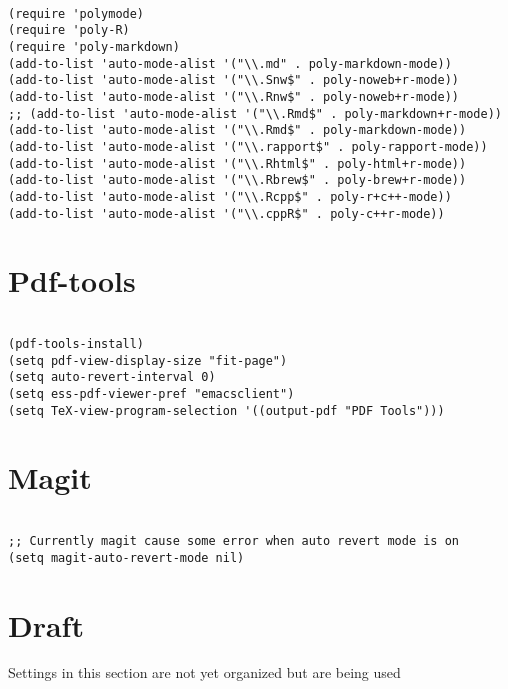 \documentclass[11pt]{article}
\begin{document}
\begin{verbatim}

(require 'polymode)
(require 'poly-R)
(require 'poly-markdown)
(add-to-list 'auto-mode-alist '("\\.md" . poly-markdown-mode))
(add-to-list 'auto-mode-alist '("\\.Snw$" . poly-noweb+r-mode))
(add-to-list 'auto-mode-alist '("\\.Rnw$" . poly-noweb+r-mode))
;; (add-to-list 'auto-mode-alist '("\\.Rmd$" . poly-markdown+r-mode))
(add-to-list 'auto-mode-alist '("\\.Rmd$" . poly-markdown-mode))
(add-to-list 'auto-mode-alist '("\\.rapport$" . poly-rapport-mode))
(add-to-list 'auto-mode-alist '("\\.Rhtml$" . poly-html+r-mode))
(add-to-list 'auto-mode-alist '("\\.Rbrew$" . poly-brew+r-mode))
(add-to-list 'auto-mode-alist '("\\.Rcpp$" . poly-r+c++-mode))
(add-to-list 'auto-mode-alist '("\\.cppR$" . poly-c++r-mode))

\end{verbatim}

\section{Pdf-tools}
\label{sec:org609035b}

\begin{verbatim}

(pdf-tools-install)
(setq pdf-view-display-size "fit-page")
(setq auto-revert-interval 0)
(setq ess-pdf-viewer-pref "emacsclient")
(setq TeX-view-program-selection '((output-pdf "PDF Tools")))

\end{verbatim}

\section{Magit}
\label{sec:orgcb261cd}

\begin{verbatim}

;; Currently magit cause some error when auto revert mode is on
(setq magit-auto-revert-mode nil)

\end{verbatim}

\section{Draft}
\label{sec:org6064bd5}
Settings in this section are not yet organized but are being used
\end{document}

